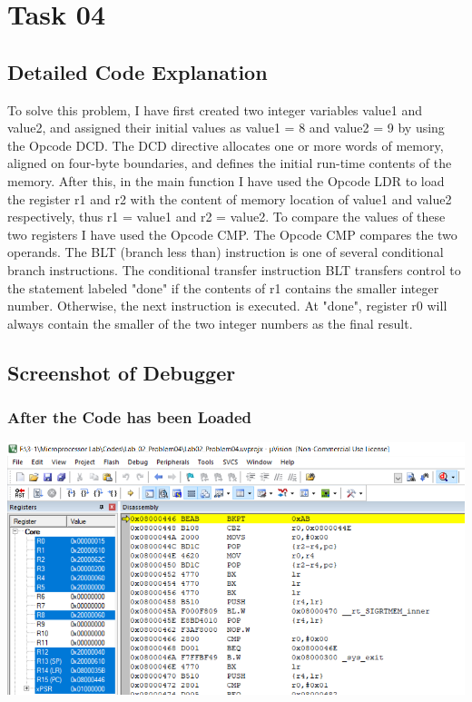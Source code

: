 \documentclass{article}
\begin{document}
\section{Task 04}

\subsection{Detailed Code Explanation}

To solve this problem, I have first created two integer variables value1 and value2, and assigned their initial values as value1 = 8 and value2 = 9 by using the Opcode DCD. The DCD directive allocates one or more words of memory, aligned on four-byte boundaries, and defines the initial run-time contents of the memory. After this, in the main function I have used the Opcode LDR to load the register r1 and r2 with the content of memory location of value1 and value2 respectively, thus r1 = value1 and r2 = value2. To compare the values of these two registers I have used the Opcode CMP. The Opcode CMP compares the two operands. The BLT (branch less than) instruction is one of several conditional branch instructions. The conditional transfer instruction BLT transfers control to the statement labeled "done" if the contents of r1 contains the smaller integer number. Otherwise, the next instruction is executed. At "done", register r0 will always contain the smaller of the two integer numbers as the final result.

\subsection{Screenshot of Debugger}

\subsubsection{After the Code has been Loaded}
\begin{center}
    \includegraphics[width=1.1\textwidth]{problem04_01.png}
\end{center}
\end{document}
